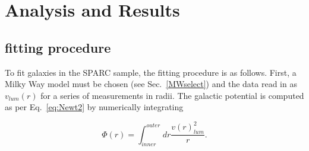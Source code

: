 \documentclass[reprint,%
 amsmath,amssymb,
 aps,
]{revtex4-1}
\begin{document}
  
  
 

 


 








\section{  Analysis and Results \label{sec:analysis}}
 
 

 
 
 




\subsection{fitting procedure}



To fit galaxies in the SPARC sample,  the fitting procedure is as follows.   First,  a       Milky Way model must be chosen (see Sec.~\ref{MWselect})  and the data  read in as $v_{lum}(r)$ for a series of measurements in radii. The galactic potential is computed as per Eq.~\ref{eq:Newt2} by numerically integrating

\begin{equation}
\Phi(r) = \int_{inner}^{outer} dr \frac{ 
v(r)^2_{lum} 
}{r}.
\label{nowthen}
\end{equation}
\end{document}
